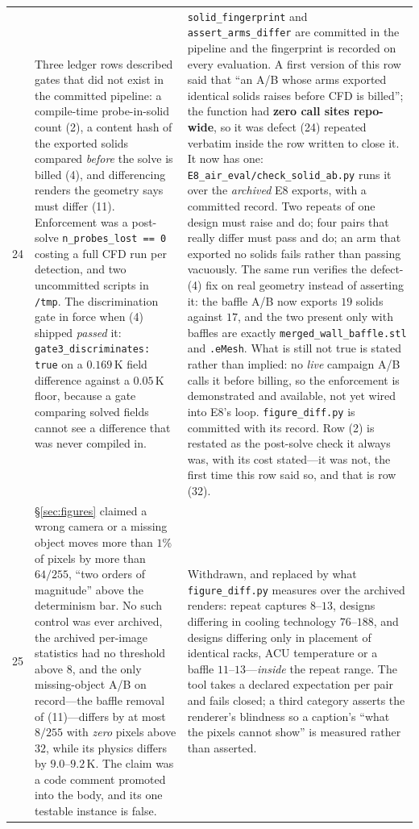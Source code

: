 \documentclass{article}
\begin{document}
\begin{table}[p]
\begin{tabular}{@{}p{0.6cm}p{7.3cm}p{7.3cm}@{}}
24 & Three ledger rows described gates that did not exist in the committed pipeline: a compile-time probe-in-solid count (2), a content hash of the exported solids compared \emph{before} the solve is billed (4), and differencing renders the geometry says must differ (11).  Enforcement was a post-solve \texttt{n\_probes\_lost == 0} costing a full CFD run per detection, and two uncommitted scripts in \texttt{/tmp}.  The discrimination gate in force when (4) shipped \emph{passed} it: \texttt{gate3\_discriminates: true} on a $0.169$\,K field difference against a $0.05$\,K floor, because a gate comparing solved fields cannot see a difference that was never compiled in. & \texttt{solid\_fingerprint} and \texttt{assert\_arms\_differ} are committed in the pipeline and the fingerprint is recorded on every evaluation.  A first version of this row said that ``an A/B whose arms exported identical solids raises before CFD is billed''; the function had \textbf{zero call sites repo-wide}, so it was defect (24) repeated verbatim inside the row written to close it.  It now has one: \texttt{E8\_air\_eval/check\_solid\_ab.py} runs it over the \emph{archived} E8 exports, with a committed record.  Two repeats of one design must raise and do; four pairs that really differ must pass and do; an arm that exported no solids fails rather than passing vacuously.  The same run verifies the defect-(4) fix on real geometry instead of asserting it: the baffle A/B now exports $19$ solids against $17$, and the two present only with baffles are exactly \texttt{merged\_wall\_baffle.stl} and \texttt{.eMesh}.  What is still not true is stated rather than implied: no \emph{live} campaign A/B calls it before billing, so the enforcement is demonstrated and available, not yet wired into E8's loop.  \texttt{figure\_diff.py} is committed with its record.  Row (2) is restated as the post-solve check it always was, with its cost stated---it was not, the first time this row said so, and that is row (32). \\
25 & \S\ref{sec:figures} claimed a wrong camera or a missing object moves more than $1\%$ of pixels by more than $64/255$, ``two orders of magnitude'' above the determinism bar.  No such control was ever archived, the archived per-image statistics had no threshold above $8$, and the only missing-object A/B on record---the baffle removal of (11)---differs by at most $8/255$ with \emph{zero} pixels above $32$, while its physics differs by $9.0$--$9.2$\,K.  The claim was a code comment promoted into the body, and its one testable instance is false. & Withdrawn, and replaced by what \texttt{figure\_diff.py} measures over the archived renders: repeat captures $8$--$13$, designs differing in cooling technology $76$--$188$, and designs differing only in placement of identical racks, ACU temperature or a baffle $11$--$13$---\emph{inside} the repeat range.  The tool takes a declared expectation per pair and fails closed; a third category asserts the renderer's blindness so a caption's ``what the pixels cannot show'' is measured rather than asserted. \\

\end{tabular}
\end{table}
\end{document}
